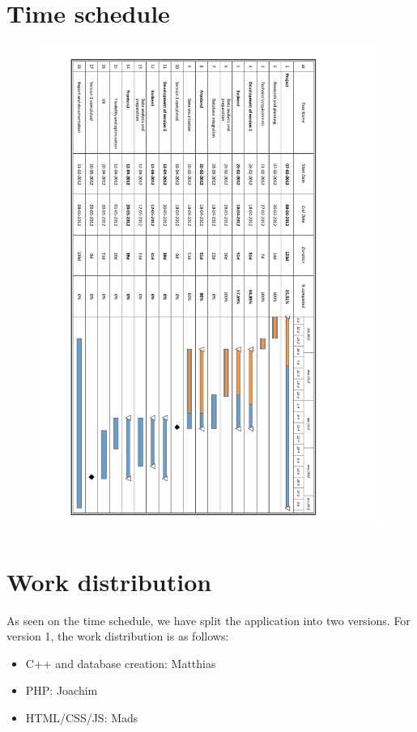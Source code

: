 \documentclass[10pt,a4paper]{article}
\begin{document}
\newpage

\section{Time schedule}

\begin{figure}[!ht]
\centering
\includegraphics[bb=1cm 28cm 18cm 28cm,scale=0.8]{planning2}
\end{figure}
\newpage

\section{Work distribution}

As seen on the time schedule, we have split the application into two versions. For version 1, the work distribution is as follows:
\begin{itemize}
  \item C++ and database creation: Matthias
  \item PHP: Joachim
  \item HTML/CSS/JS: Mads
\end{itemize}
\end{document}
